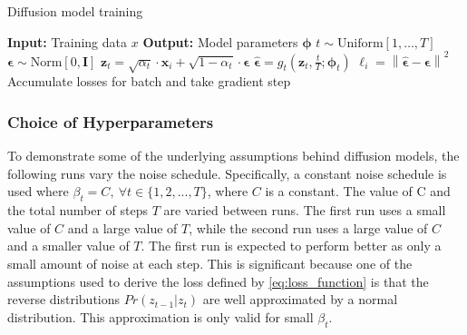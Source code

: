 \documentclass[11pt]{article}
\begin{document}
\begin{algorithm}
\caption{Diffusion model training}
\begin{algorithmic}[1]
\State \textbf{Input:} Training data $x$
\State \textbf{Output:} Model parameters $\boldsymbol{\phi}$
 
     
        \State $t \sim \text{Uniform}[1, \ldots, T]$ 
        \State $\boldsymbol{\epsilon} \sim \text{Norm}[0, \mathbf{I}]$ 
        \State $\boldsymbol{\mathbf{z}}_{t} = \sqrt{\alpha_t} \cdot \mathbf{x}_i + \sqrt{1 - \alpha_t} \cdot \boldsymbol{\epsilon}$ 
        \State $\hat{\boldsymbol{\epsilon}} = g_t \left( \boldsymbol{\mathbf{z}}_{t}, \frac{t}{T}; \boldsymbol{\phi}_t \right)$ 
        \State $\ell_i = \left\|\hat{\boldsymbol{\epsilon}} - \boldsymbol{\epsilon} \right\|^2$ 
    \EndFor
    \State Accumulate losses for batch and take gradient step
\EndWhile
\end{algorithmic}
\end{algorithm}

\subsubsection{Choice of Hyperparameters}
To demonstrate some of the underlying assumptions behind diffusion models, the following runs vary the noise schedule.
Specifically, a constant noise schedule is used where $\beta_t = C, \ \forall t \in \{1,2,...,T\}$, where $C$ is a constant.
The value of C and the total number of steps $T$ are varied between runs. The first run uses a small value of $C$ and a large value of $T$, while the second run uses a large value of $C$ and a smaller value of $T$. The first run is expected to perform better as only a small amount of noise at each step. This is significant because one of the assumptions used to derive the loss defined by \ref{eq:loss_function} is that the reverse distributions $Pr(z_{t-1}|z_{t})$ are well approximated by a normal distribution. This approximation is only valid for small $\beta_t$.
\end{document}
